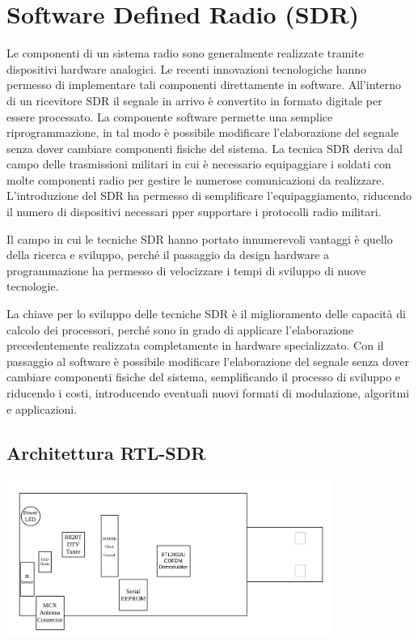 \section*{Software Defined Radio (SDR)}
Le componenti di un sistema radio sono generalmente realizzate tramite dispositivi hardware analogici.
Le recenti innovazioni tecnologiche hanno permesso di implementare tali componenti direttamente in software.
All'interno di un ricevitore SDR il segnale in arrivo è convertito in formato digitale per essere processato.
La componente software permette una semplice riprogrammazione, in tal modo è possibile modificare l'elaborazione del segnale senza dover cambiare componenti fisiche del sistema.
La tecnica SDR deriva dal campo delle trasmissioni militari in cui è necessario equipaggiare i soldati con molte componenti radio per gestire le numerose comunicazioni da realizzare.
L'introduzione del SDR ha permesso di semplificare l'equipaggiamento, riducendo il numero di dispositivi necessari pper supportare i protocolli radio militari.

Il campo in cui le tecniche SDR hanno portato innumerevoli vantaggi è quello della ricerca e sviluppo, perché il passaggio da design hardware a programmazione ha permesso di velocizzare i tempi di sviluppo di nuove tecnologie.

La chiave per lo sviluppo delle tecniche SDR è il miglioramento delle capacità di calcolo dei processori, perché sono in grado di applicare l'elaborazione precedentemente realizzata completamente in hardware specializzato.
Con il passaggio al software è possibile modificare l'elaborazione del segnale senza dover cambiare componenti fisiche del sistema, semplificando il processo di sviluppo e riducendo i costi, introducendo eventuali nuovi formati di modulazione, algoritmi e applicazioni.


\subsection*{Architettura RTL-SDR}
\begin{center}
    \includegraphics[width=0.8\textwidth]{imgs/sdr.png} 
\end{center}


